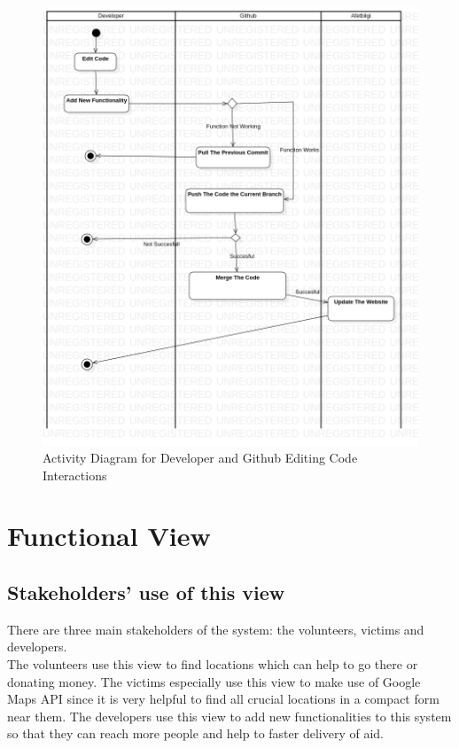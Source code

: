 \begin{figure}[H]
    \includegraphics[scale = 0.5]{assets/Activity DiagramEditingCode.png}
    \caption[Activity Diagram for Developer and Github Editing Code Interactions]{Activity Diagram for Developer and Github Editing Code Interactions}
\end{figure}

\section{Functional View}

\subsection{Stakeholders' use of this view}

There are three main stakeholders of the system: the volunteers, victims and developers. \\

The volunteers use this view to find locations which can help to go there or donating money.
The victims especially use this view to make use of Google Maps API since it is very helpful to find all crucial locations in a compact form near them.
The developers use this view to add new functionalities to this system so that they can reach more people and help to faster delivery of aid.

